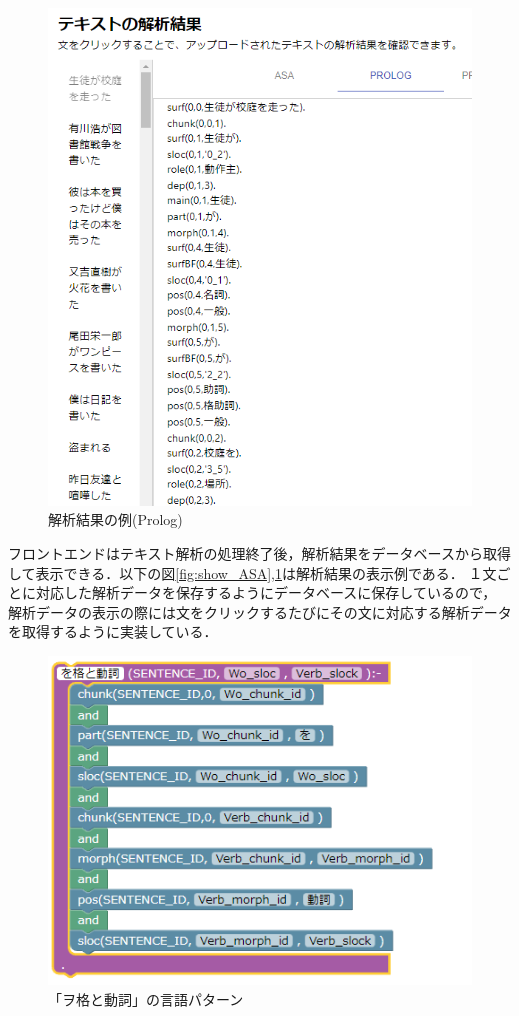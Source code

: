 \documentclass{FITpaper}
\begin{document}
\begin{figure}[htbp]
  \centering
  \includegraphics[scale=0.4]{fig/convert_result_prolog.png}
  \caption{解析結果の例(Prolog)}
  \label{fig:show_prolog}
\end{figure}

フロントエンドはテキスト解析の処理終了後，解析結果をデータベースから取得して表示できる．以下の図\ref{fig:show_ASA},\ref{fig:show_prolog}は解析結果の表示例である．
１文ごとに対応した解析データを保存するようにデータベースに保存しているので，
解析データの表示の際には文をクリックするたびにその文に対応する解析データを取得するように実装している．


\begin{figure}[htbp]
  \centering
  \includegraphics[scale=0.6]{fig/wo.png}
  \caption{「ヲ格と動詞」の言語パターン}
  \label{fig:wo_block}
\end{figure}
\end{document}
